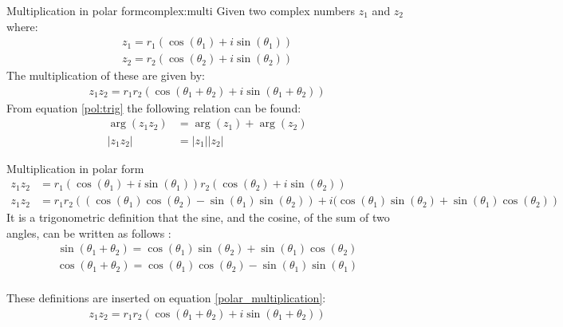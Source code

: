 \begin{theorem}{Multiplication in polar form}{complex:multi}
Given two complex numbers $z_1$ and $z_2$ where:
\begin{align*}
z_1=r_1(\cos(\theta_1)+i\sin(\theta_1)) 
\\
z_2=r_2(\cos(\theta_2)+i\sin(\theta_2))
\end{align*}
The multiplication of these are given by:
\begin{align}
z_1 z_2=r_1r_2\left( \cos(\theta_1+\theta_2)+ i \sin(\theta_1+\theta_2)\right) \label{pol:trig}
\end{align}
From equation \ref{pol:trig} the following relation can be found:
\begin{align}
\arg(z_1z_2)&=\arg(z_1)+\arg(z_2)
\\
|z_1z_2|&=|z_1||z_2|
\end{align}
\end{theorem}
\begin{prof}{Multiplication in polar form}{}
\begin{align}
z_1 z_2&=r_1( \cos(\theta_1)+ i \sin(\theta_1))r_2( \cos(\theta_2)+ i \sin(\theta_2)) \nonumber
\\
\label{polar_multiplication}
z_1z_2&=r_1r_2\left( (\cos(\theta_1)\cos(\theta_2)-\sin(\theta_1) \sin(\theta_2))+i(\cos(\theta_1)\sin(\theta_2)+\sin(\theta_1)\cos(\theta_2)\right)
\end{align}
It is a trigonometric definition that the sine, and the cosine, of the sum of two angles, can be written as follows \cite[p. A-14 Appendicies]{calc}:
\\
\begin{align} 
\sin(\theta_1+\theta_2)=\cos(\theta_1)\sin(\theta_2)+\sin(\theta_1)\cos(\theta_2) \label{sum_cos_sin}
\end{align}
\begin{align*}
\cos(\theta_1+\theta_2)=\cos(\theta_1)\cos(\theta_2)-\sin(\theta_1)\sin(\theta_1)
\end{align*}
\\
These definitions are inserted on equation \eqref{polar_multiplication}:
\\
\begin{align*}
z_1 z_2=r_1r_2\left( \cos(\theta_1+\theta_2)+ i \sin(\theta_1+\theta_2)\right)
\end{align*}
\end{prof}
